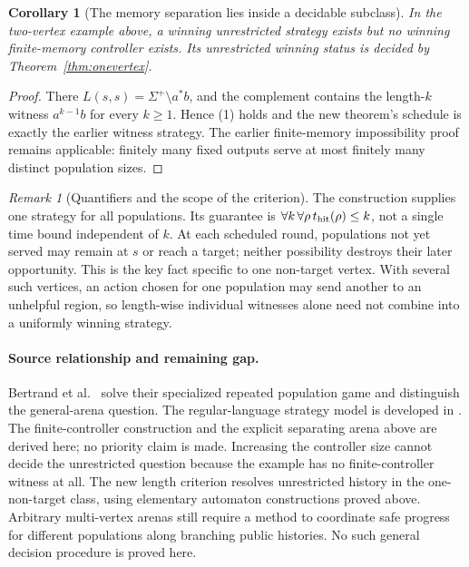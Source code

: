 \documentclass[11pt]{article}
\newtheorem{corollary}{Corollary}
\theoremstyle{definition}
\theoremstyle{remark}
\newtheorem{remark}{Remark}
\begin{document}
\begin{corollary}[The memory separation lies inside a decidable subclass]
In the two-vertex example above, a winning unrestricted strategy exists but
no winning finite-memory controller exists. Its unrestricted winning status
is decided by Theorem~\ref{thm:onevertex}.
\end{corollary}
\begin{proof}
There $L(s,s)=\Sigma^+\setminus a^*b$, and the complement contains the
length-$k$ witness $a^{k-1}b$ for every $k\geq1$. Hence (1) holds and the
new theorem's schedule is exactly the earlier witness strategy.
The earlier finite-memory impossibility proof remains applicable: finitely
many fixed outputs serve at most finitely many distinct population sizes.
\end{proof}

\begin{remark}[Quantifiers and the scope of the criterion]
The construction supplies one strategy for all populations. Its guarantee is
$\forall k\,\forall\rho\, t_{\rm hit}(\rho)\leq k$, not a single time bound
independent of $k$. At each scheduled round, populations not yet served may
remain at $s$ or reach a target; neither possibility destroys their later
opportunity. This is the key fact specific to one non-target vertex.
With several such vertices, an action chosen for one population may send
another to an unhelpful region, so length-wise individual witnesses alone
need not combine into a uniformly winning strategy.
\end{remark}

\paragraph{Source relationship and remaining gap.}
Bertrand et al.~\cite{reach} solve their specialized repeated population game and distinguish the general-arena question. The regular-language strategy model is developed in \cite{safe}. The finite-controller construction and the explicit separating arena above are derived here; no priority claim is made. Increasing the controller size cannot decide the unrestricted question
because the example has no finite-controller witness at all. The new length
criterion resolves unrestricted history in the one-non-target class, using
elementary automaton constructions proved above. Arbitrary multi-vertex
arenas still require a method to coordinate safe progress for different
populations along branching public histories. No such general decision
procedure is proved here.
\end{document}
